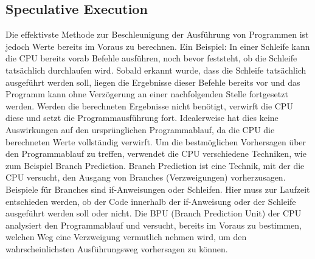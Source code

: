 \subsection{Speculative Execution}
\label{subsec:speculative-execution}
Die effektivste Methode zur Beschleunigung der Ausführung von Programmen ist jedoch Werte bereits im Voraus zu berechnen.
Ein Beispiel: In einer Schleife kann die CPU bereits vorab Befehle ausführen, noch bevor feststeht, ob die Schleife tatsächlich durchlaufen wird.
Sobald erkannt wurde, dass die Schleife tatsächlich ausgeführt werden soll, liegen die Ergebnisse dieser Befehle bereits vor und das Programm kann ohne Verzögerung an einer nachfolgenden Stelle fortgesetzt werden.
Werden die berechneten Ergebnisse nicht benötigt, verwirft die CPU diese und setzt die Programmausführung fort.
Idealerweise hat dies keine Auswirkungen auf den ursprünglichen Programmablauf, da die CPU die berechneten Werte vollständig verwirft.
Um die bestmöglichen Vorhersagen über den Programmablauf zu treffen, verwendet die CPU verschiedene Techniken, wie zum Beispiel Branch Prediction.
Branch Prediction ist eine Technik, mit der die CPU versucht, den Ausgang von Branches (Verzweigungen) vorherzusagen.
Beispiele für Branches sind if-Anweisungen oder Schleifen.
Hier muss zur Laufzeit entschieden werden, ob der Code innerhalb der if-Anweisung oder der Schleife ausgeführt werden soll oder nicht.
Die BPU (Branch Prediction Unit) der CPU analysiert den Programmablauf und versucht, bereits im Voraus zu bestimmen, welchen Weg eine Verzweigung vermutlich nehmen wird, um den wahrscheinlichsten Ausführungsweg vorhersagen zu können.
